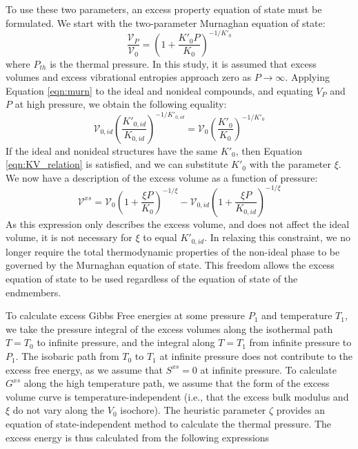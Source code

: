 To use these two parameters, an excess property equation of state must be formulated. We start with the two-parameter Murnaghan equation of state:
\begin{equation}
  \frac{\mathcal{V}_P}{\mathcal{V}_0} = \left( 1 + \frac{K'_0 P}{K_0} \right)^{-1/K'_0}
\label{eqn:murn}
\end{equation}
\noindent where $P_{th}$ is the thermal pressure. In this study, it is assumed that excess volumes and excess vibrational entropies approach zero as $P \rightarrow \infty$. Applying Equation \ref{eqn:murn} to the ideal and nonideal compounds, and equating $V_P$ and $P$ at high pressure, we obtain the following equality:
\begin{equation}
\mathcal{V}_{0, id} \left( \frac{K'_{0, id}}{K_{0, id}} \right)^{-1/K'_{0, id}} = \mathcal{V}_{0} \left( \frac{K'_{0}}{K_{0}} \right)^{-1/K'_0}
\end{equation}
If the ideal and nonideal structures have the same $K'_0$, then Equation \ref{eqn:KV_relation} is satisfied, and we can substitute $K'_0$ with the parameter $\xi$. We now have a description of the excess volume as a function of pressure:
\begin{equation}
\mathcal{V}^{xs} = \mathcal{V}_0 \left(1 + \frac{\xi P}{K_0}\right)^{-1/\xi} - \mathcal{V}_{0, id} \left(1 + \frac{\xi P }{K_{0, id}}\right)^{-1/\xi} 
\end{equation}
\noindent As this expression only describes the excess volume, and does not affect the ideal volume, it is not necessary for $\xi$ to equal $K'_{0, id}$. In relaxing this constraint, we no longer require the total thermodynamic properties of the non-ideal phase to be governed by the Murnaghan equation of state. This freedom allows the excess equation of state to be used regardless of the equation of state of the endmembers. 

To calculate excess Gibbs Free energies at some pressure $P_1$ and temperature $T_1$, we take the pressure integral of the excess volumes along the isothermal path $T = T_0$ to infinite pressure, and the integral along $T = T_1$ from infinite pressure to $P_1$. The isobaric path from $T_0$ to $T_1$ at infinite pressure does not contribute to the excess free energy, as we assume that $S^{xs} = 0$ at infinite pressure. To calculate $G^{xs}$ along the high temperature path, we assume that the form of the excess volume curve is temperature-independent (i.e., that the excess bulk modulus and $\xi$ do not vary along the $V_0$ isochore). The heuristic parameter $\zeta$ provides an equation of state-independent method to calculate the thermal pressure. The excess energy is thus calculated from the following expressions

